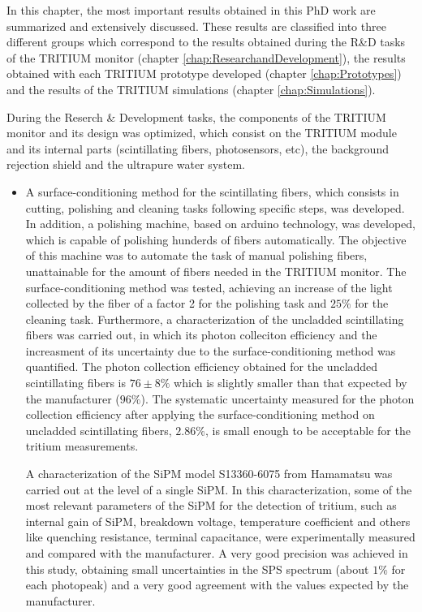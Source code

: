 In this chapter, the most important results obtained in this PhD work are summarized and extensively discussed. These results are classified into three different groups which correspond to the results obtained during the R\&D tasks of the TRITIUM monitor (chapter \ref{chap:ResearchandDevelopment}), the results obtained with each TRITIUM prototype developed (chapter \ref{chap:Prototypes}) and the results of the TRITIUM simulations (chapter \ref{chap:Simulations}).

During the Reserch \& Development tasks, the components of the TRITIUM monitor and its design was optimized, which consist on the TRITIUM module and its internal parts (scintillating fibers, photosensors, etc), the background rejection shield and the ultrapure water system. 

\begin{itemize}
\item{} A surface-conditioning method for the scintillating fibers, which consists in cutting, polishing and cleaning tasks following specific steps, was developed. In addition, a polishing machine, based on arduino technology, was developed, which is capable of polishing hunderds of fibers automatically. The objective of this machine was to automate the task of manual polishing fibers, unattainable for the amount of fibers needed in the TRITIUM monitor. The surface-conditioning method was tested, achieving an increase of the light collected by the fiber of a factor 2 for the polishing task and $25\%$ for the cleaning task. Furthermore, a characterization of the uncladded scintillating fibers was carried out, in which its photon colleciton efficiency and the increasment of its uncertainty due to the surface-conditioning method was quantified. The photon collection efficiency obtained for the uncladded scintillating fibers is $76\pm 8\%$ which is slightly smaller than that expected by the manufacturer ($96\%$). The systematic uncertainty measured for the photon collection efficiency after applying the surface-conditioning method on uncladded scintillating fibers, $2.86\%$, is small enough to be acceptable for the tritium measurements.

A characterization of the SiPM model S13360-6075 from Hamamatsu was carried out at the level of a single SiPM. In this characterization, some of the most relevant parameters of the SiPM for the detection of tritium, such as internal gain of SiPM, breakdown voltage, temperature coefficient and others like quenching resistance, terminal capacitance, were experimentally measured and compared with the manufacturer. A very good precision was achieved in this study, obtaining small uncertainties in the SPS spectrum (about $1\%$ for each photopeak) and a very good agreement with the values expected by the manufacturer.


\end{itemize}
